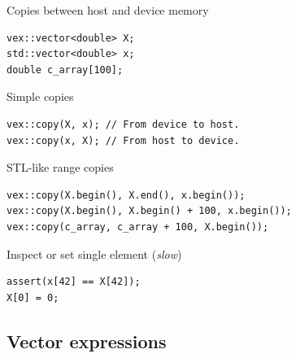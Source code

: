 \documentclass[@BEAMER_OPTIONS@]{beamer}
\begin{document}
\begin{frame}[fragile]{Copies between host and device memory}
    \begin{exampleblock}{}
        \begin{lstlisting}
vex::vector<double> X;
std::vector<double> x;
double c_array[100];
        \end{lstlisting}
    \end{exampleblock}
    \begin{exampleblock}{Simple copies}
        \begin{lstlisting}
vex::copy(X, x); // From device to host.
vex::copy(x, X); // From host to device.
        \end{lstlisting}
    \end{exampleblock}
    \begin{exampleblock}{STL-like range copies}
        \begin{lstlisting}
vex::copy(X.begin(), X.end(), x.begin());
vex::copy(X.begin(), X.begin() + 100, x.begin());
vex::copy(c_array, c_array + 100, X.begin());
        \end{lstlisting}
    \end{exampleblock}
    \begin{exampleblock}{Inspect or set single element (\emph{slow})}
        \begin{lstlisting}
assert(x[42] == X[42]);
X[0] = 0;
        \end{lstlisting}
    \end{exampleblock}
\end{frame}



\subsection{Vector expressions}
\end{document}
